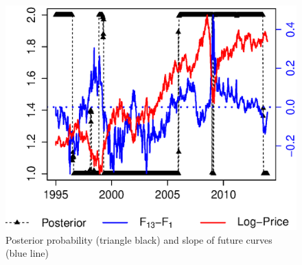 \begin{figure}
	\centering
	\includegraphics[scale=.75]{Posterior_Data_LogPrice}
	\caption{Posterior probability (triangle black) and slope of future curves (blue line)}
	\label{fig:posterior:data:logprice}
\end{figure}





